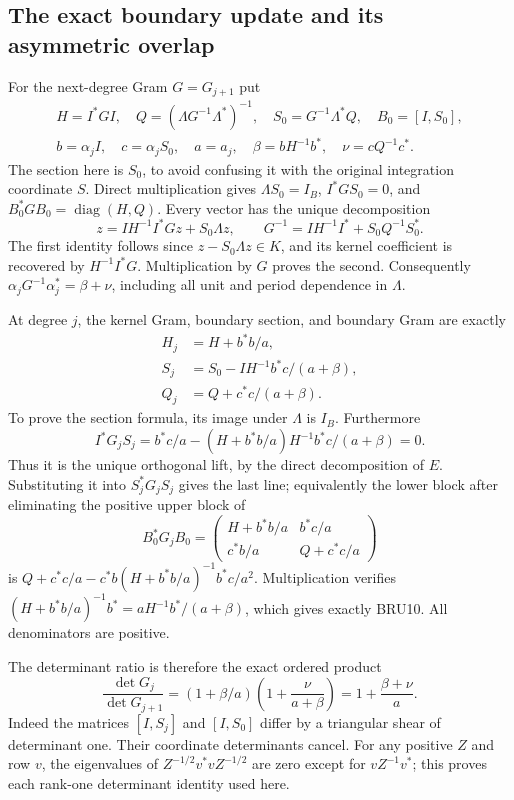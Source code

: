 \subsection{The exact boundary update and its asymmetric overlap}

For the next-degree Gram $G=G_{j+1}$ put
\[
 \begin{gathered}
 H=I^*GI,\quad Q=(\Lambda G^{-1}\Lambda^*)^{-1},\quad
 S_0=G^{-1}\Lambda^*Q,\quad B_0=[I,S_0],\\
 b=\alpha_j I,\quad c=\alpha_jS_0,\quad a=a_j,\quad
 \beta=bH^{-1}b^*,\quad \nu=cQ^{-1}c^*.
 \end{gathered}\tag{BRU8}
\]
The section here is $S_0$, to avoid confusing it with the original
integration coordinate $S$. Direct multiplication gives
$\Lambda S_0=I_B$, $I^*GS_0=0$, and
$B_0^*GB_0=\operatorname{diag}(H,Q)$. Every vector has the unique
decomposition
\[
 z=I H^{-1}I^*Gz+S_0\Lambda z,
 \qquad G^{-1}=IH^{-1}I^*+S_0Q^{-1}S_0^*.
 \tag{BRU9}
\]
The first identity follows since $z-S_0\Lambda z\in K$, and its
kernel coefficient is recovered by $H^{-1}I^*G$. Multiplication
by $G$ proves the second. Consequently
$\alpha_jG^{-1}\alpha_j^*=\beta+\nu$, including all unit and
period dependence in $\Lambda$.

At degree $j$, the kernel Gram, boundary section, and boundary Gram
are exactly
\[
 \boxed{\begin{aligned}
 H_j&=H+b^*b/a,\\
 S_j&=S_0-IH^{-1}b^*c/(a+\beta),\\
 Q_j&=Q+c^*c/(a+\beta).
 \end{aligned}}\tag{BRU10}
\]
To prove the section formula, its image under $\Lambda$ is $I_B$.
Furthermore
\[
 I^*G_jS_j=b^*c/a-(H+b^*b/a)H^{-1}b^*c/(a+\beta)=0.
\]
Thus it is the unique orthogonal lift, by the direct decomposition
of $E$. Substituting it into $S_j^*G_jS_j$ gives the last line;
equivalently the lower block after eliminating the positive upper
block of
\[
 B_0^*G_jB_0=
 \begin{pmatrix}H+b^*b/a&b^*c/a\\c^*b/a&Q+c^*c/a\end{pmatrix}
\]
is $Q+c^*c/a-c^*b(H+b^*b/a)^{-1}b^*c/a^2$.
Multiplication verifies
$(H+b^*b/a)^{-1}b^*=aH^{-1}b^*/(a+\beta)$,
which gives exactly BRU10. All denominators are positive.

The determinant ratio is therefore the exact ordered product
\[
 \boxed{\frac{\det G_j}{\det G_{j+1}}
 =(1+\beta/a)\left(1+\frac{\nu}{a+\beta}\right)
 =1+\frac{\beta+\nu}{a}.}\tag{BRU11}
\]
Indeed the matrices $[I,S_j]$ and $[I,S_0]$ differ by a triangular
shear of determinant one. Their coordinate determinants cancel.
For any positive $Z$ and row $v$, the eigenvalues of
$Z^{-1/2}v^*vZ^{-1/2}$ are zero except for $vZ^{-1}v^*$;
this proves each rank-one determinant identity used here.

